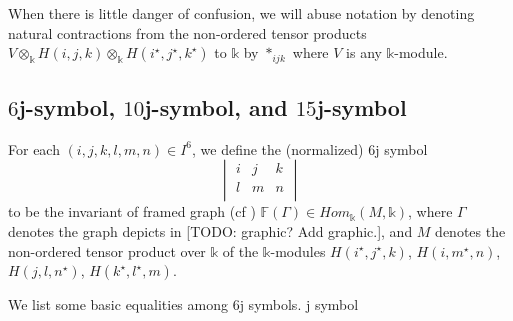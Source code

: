 \noindent When there is little danger of confusion, we will abuse
notation by denoting natural contractions from the non-ordered
tensor products
$V \otimes_{\mathbb{k}} H(i,j,k) \otimes_{\mathbb{k}} H(i^{\star}, j^{\star}, k^{\star})$
to $\mathbb{k}$ by $\ast_{ijk}$ where $V$ is any
$\mathbb{k}$-module.

\subsection{$6$j-symbol, $10$j-symbol, and $15$j-symbol}

\newcommand{\sixJSymbol}[6]{\begin{vmatrix}
  #1 & #2 & #3 \\
  #4 & #5 & #6 \\
\end{vmatrix}}

\newcommand{\tenJSymbol}[8]{\begin{vmatrix}
    #1 & #2 & #3 & #4 \\
     * & #5 & #6 & #7 \\
    \tenJSymbolContinued #8 \\
  \end{vmatrix}_{10j}
}

\newcommand\tenJSymbolContinued[3]{
  * & * & #1 & #2 \\
  * & * & * & #3
}

\begin{definition}[$6$j-symbol]\label{def/6j-symbol}
  For each $(i,j,k,l,m,n) \in I^{6}$, we define the (normalized)
  $6$j symbol
  $$\sixJSymbol{i}{j}{k}{l}{m}{n}$$
  to be the invariant of framed graph (cf \cite[section
  VI.4]{turaev-qiok-3-manifolds})
  $\mathbb{F}(\Gamma) \in Hom_{\mathbb{k}}(M, \mathbb{k})$, where
  $\Gamma$ denotes the graph depicts in [TODO: graphic? Add
  graphic.], and $M$ denotes the non-ordered tensor product over
  $\mathbb{k}$ of the $\mathbb{k}$-modules
  $H(i^{\star}, j^{\star}, k)$, $H(i, m^{\star}, n)$,
  $H(j, l, n^{\star})$, $H(k^{\star}, l^{\star}, m)$.
\end{definition}

\noindent We list some basic equalities among $6$j symbols. j
symbol

